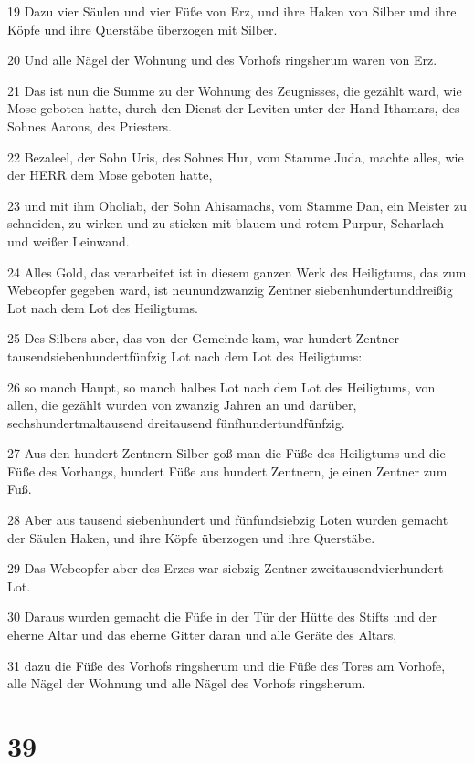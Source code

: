 \par 19 Dazu vier Säulen und vier Füße von Erz, und ihre Haken von Silber und ihre Köpfe und ihre Querstäbe überzogen mit Silber.
\par 20 Und alle Nägel der Wohnung und des Vorhofs ringsherum waren von Erz.
\par 21 Das ist nun die Summe zu der Wohnung des Zeugnisses, die gezählt ward, wie Mose geboten hatte, durch den Dienst der Leviten unter der Hand Ithamars, des Sohnes Aarons, des Priesters.
\par 22 Bezaleel, der Sohn Uris, des Sohnes Hur, vom Stamme Juda, machte alles, wie der HERR dem Mose geboten hatte,
\par 23 und mit ihm Oholiab, der Sohn Ahisamachs, vom Stamme Dan, ein Meister zu schneiden, zu wirken und zu sticken mit blauem und rotem Purpur, Scharlach und weißer Leinwand.
\par 24 Alles Gold, das verarbeitet ist in diesem ganzen Werk des Heiligtums, das zum Webeopfer gegeben ward, ist neunundzwanzig Zentner siebenhundertunddreißig Lot nach dem Lot des Heiligtums.
\par 25 Des Silbers aber, das von der Gemeinde kam, war hundert Zentner tausendsiebenhundertfünfzig Lot nach dem Lot des Heiligtums:
\par 26 so manch Haupt, so manch halbes Lot nach dem Lot des Heiligtums, von allen, die gezählt wurden von zwanzig Jahren an und darüber, sechshundertmaltausend dreitausend fünfhundertundfünfzig.
\par 27 Aus den hundert Zentnern Silber goß man die Füße des Heiligtums und die Füße des Vorhangs, hundert Füße aus hundert Zentnern, je einen Zentner zum Fuß.
\par 28 Aber aus tausend siebenhundert und fünfundsiebzig Loten wurden gemacht der Säulen Haken, und ihre Köpfe überzogen und ihre Querstäbe.
\par 29 Das Webeopfer aber des Erzes war siebzig Zentner zweitausendvierhundert Lot.
\par 30 Daraus wurden gemacht die Füße in der Tür der Hütte des Stifts und der eherne Altar und das eherne Gitter daran und alle Geräte des Altars,
\par 31 dazu die Füße des Vorhofs ringsherum und die Füße des Tores am Vorhofe, alle Nägel der Wohnung und alle Nägel des Vorhofs ringsherum.

\chapter{39}

